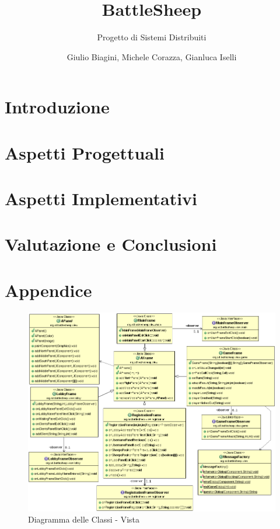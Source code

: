 \documentclass[a4paper,10pt]{scrartcl}
\begin{document}
\title{BattleSheep}
\subtitle{Progetto di Sistemi Distribuiti}
\author{Giulio Biagini, Michele Corazza, Gianluca Iselli}
\maketitle

\begin{abstract}

\end{abstract}

\section{Introduzione}


\section{Aspetti Progettuali}




\section{Aspetti Implementativi}

%



\section{Valutazione e Conclusioni}


\newpage

\section{Appendice}

\begin{figure}[!h]
	\centering
	\includegraphics[scale=0.4]{core/imgs/UML/VistaBellaUML-noattr.png}
	\caption{Diagramma delle Classi - Vista}
	\label{figure:class_diagram_view}
\end{figure}
\end{document}
